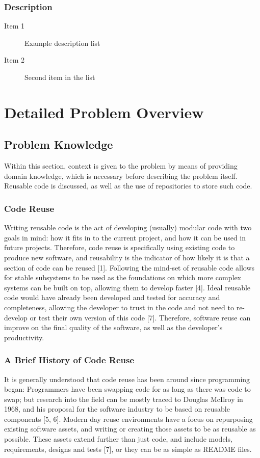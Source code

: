 \documentclass[11pt,openright,a4paper]{report}
\begin{document}
\subsection{Description}

\begin{description}
\item[Item 1] Example description list
\item[Item 2] Second item in the list
\end{description}


\chapter{Detailed Problem Overview}
\section{Problem Knowledge}
Within this section, context is given to the problem by means of providing domain knowledge, which is necessary before describing the problem itself. Reusable code is discussed, as well as the use of repositories to store such code. 

\subsection{Code Reuse}
Writing reusable code is the act of developing (usually) modular code with two goals in mind: how it fits in to the current project, and how it can be used in future projects.
Therefore, code reuse is specifically using existing code to produce new software, and reusability is the indicator of how likely it is that a section of code can be reused [1]. 
Following the mind-set of reusable code allows for stable subsystems to be used as the foundations on which more complex systems can be built on top, allowing them to develop faster [4].
Ideal reusable code would have already been developed and tested for accuracy and completeness, allowing the developer to trust in the code and not need to re-develop or test their own version of this code [7]. Therefore, software reuse can improve on the final quality of the software, as well as the developer’s productivity.

\subsection{A Brief History of Code Reuse}
It is generally understood that code reuse has been around since programming began: Programmers have been swapping code for as long as there was code to swap; but research into the field can be mostly traced to Douglas McIlroy in 1968, and his proposal for the software industry to be based on reusable components [5, 6]. 
Modern day reuse environments have a focus on repurposing existing software assets, and writing or creating those assets to be as reusable as possible. These assets extend further than just code, and include models, requirements, designs and tests [7], or they can be as simple as README files.
\end{document}
